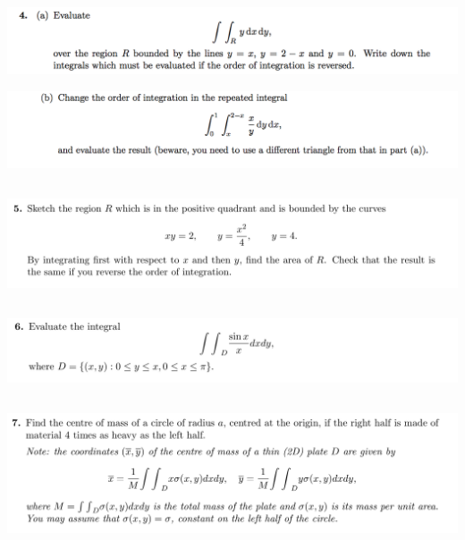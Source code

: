 \documentclass[12pt]{article}
\begin{document}
\newpage
\subsection{}
\begin{mdframed}
\includegraphics[width=400pt]{img/oxford-prelims-M5-multivariable-calc-1-4-a.png}
\end{mdframed}

\begin{mdframed}
\includegraphics[width=400pt]{img/oxford-prelims-M5-multivariable-calc-1-4-b.png}
\end{mdframed}

\subsection{}
\begin{mdframed}
\includegraphics[width=400pt]{img/oxford-prelims-M5-multivariable-calc-1-5.png}
\end{mdframed}

\subsection{}
\begin{mdframed}
\includegraphics[width=400pt]{img/oxford-prelims-M5-multivariable-calc-1-6.png}
\end{mdframed}

\subsection{}
\begin{mdframed}
\includegraphics[width=400pt]{img/oxford-prelims-M5-multivariable-calc-1-7.png}
\end{mdframed}
\end{document}
